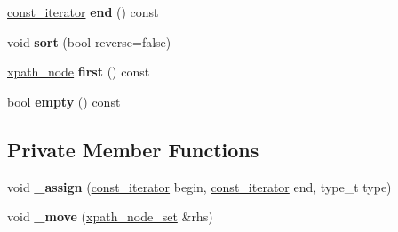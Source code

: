 \begin{DoxyCompactItemize}
\hyperlink{classpugi_1_1xpath__node}{const\+\_\+iterator} {\bfseries end} () const
\item 
\mbox{\label{classpugi_1_1xpath__node__set_a7f264ad9a2736e9dc2d6a2de25cb67d1}} 
void {\bfseries sort} (bool reverse=false)
\item 
\mbox{\label{classpugi_1_1xpath__node__set_a9fcda507a65af61e2f45cdf96c791044}} 
\hyperlink{classpugi_1_1xpath__node}{xpath\+\_\+node} {\bfseries first} () const
\item 
\mbox{\label{classpugi_1_1xpath__node__set_a0bf4e1c7a28ad29f8018d7b7c7a43257}} 
bool {\bfseries empty} () const
\end{DoxyCompactItemize}
\subsection*{Private Member Functions}
\begin{DoxyCompactItemize}
\item 
\mbox{\label{classpugi_1_1xpath__node__set_a251e63ad280361091758fa678fad28e1}} 
void {\bfseries \+\_\+assign} (\hyperlink{classpugi_1_1xpath__node}{const\+\_\+iterator} begin, \hyperlink{classpugi_1_1xpath__node}{const\+\_\+iterator} end, type\+\_\+t type)
\item 
\mbox{\label{classpugi_1_1xpath__node__set_acd90708deecb42e6934c90dd8d1d9f5f}} 
void {\bfseries \+\_\+move} (\hyperlink{classpugi_1_1xpath__node__set}{xpath\+\_\+node\+\_\+set} \&rhs)
\end{DoxyCompactItemize}
